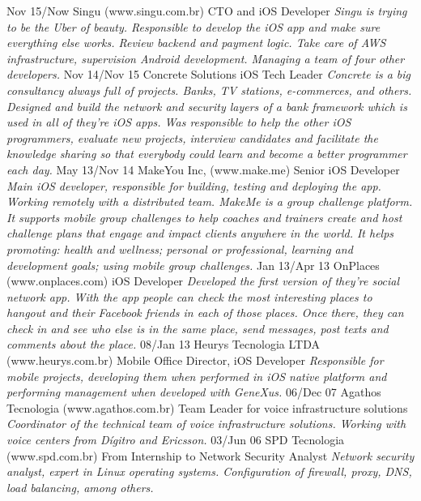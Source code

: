 \documentclass[]{friggeri-cv}
\begin{document}
\begin{entrylist}
  \entry
    {Nov 15/Now}
    {Singu (www.singu.com.br)}
    {CTO and iOS Developer}
    {\emph{Singu is trying to be the Uber of beauty. Responsible to develop the iOS app and make sure everything else works. Review backend and payment logic. Take care of AWS infrastructure, supervision Android development. Managing a team of four other developers.}}
  \entry
    {Nov 14/Nov 15}
    {Concrete Solutions}
    {iOS Tech Leader}
    {\emph{Concrete is a big consultancy always full of projects. Banks, TV stations, e-commerces, and others. Designed and build the network and security layers of a bank framework which is used in all of they're iOS apps. Was responsible to help the other iOS programmers, evaluate new projects, interview candidates and facilitate the knowledge sharing so that everybody could learn and become a better programmer each day.}}
  \entry
    {May 13/Nov 14}
    {MakeYou Inc, (www.make.me)}
    {Senior iOS Developer}
    {\emph{Main iOS developer, responsible for building, testing and deploying the app. Working remotely with a distributed team.
MakeMe is a group challenge platform. It supports mobile group challenges to help coaches and trainers create and host challenge plans that engage and impact clients anywhere in the world. It  helps promoting: health and wellness; personal or professional, learning and development goals; using mobile group challenges.}}
  \entry
    {Jan 13/Apr 13}
    {OnPlaces (www.onplaces.com)}
    {iOS Developer}
    {\emph{Developed the first version of they're social network app. With the app people can check the most interesting places to hangout and their Facebook friends in each of those places. Once there, they can check in and see who else is in the same place, send messages, post texts and comments about the place.}}
  \entry
    {08/Jan 13}
    {Heurys Tecnologia LTDA (www.heurys.com.br)}
    {Mobile Office Director, iOS Developer}
    {\emph{Responsible for mobile projects, developing them when performed in iOS native platform and performing management when developed with GeneXus.}}
  \entry
    {06/Dec 07}
    {Agathos Tecnologia (www.agathos.com.br)}
    {Team Leader for voice infrastructure solutions}
    {\emph{Coordinator of the technical team of voice infrastructure solutions. Working with voice centers from Dígitro and Ericsson.}}
  \entry
    {03/Jun 06}
    {SPD Tecnologia (www.spd.com.br)}
    {From Internship to Network Security Analyst}
    {\emph{Network security analyst, expert in Linux operating systems. Configuration of firewall, proxy, DNS, load balancing, among others.}}
\end{entrylist}
\end{document}
